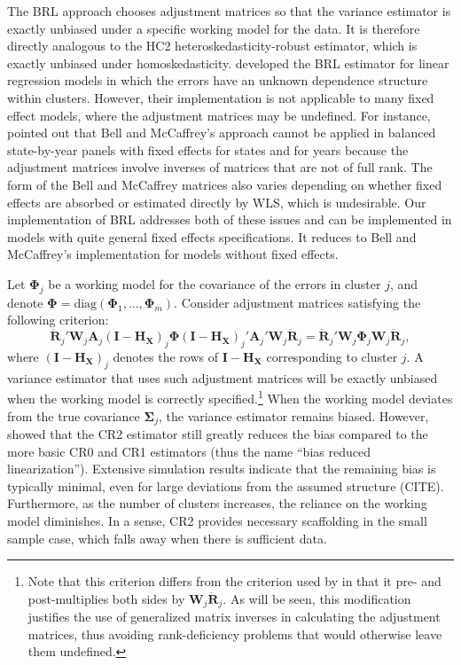 \documentclass[12pt]{article}\usepackage[]{graphicx}\usepackage[]{color}
\newcommand{\bm}{\mathbf}
\newcommand{\bs}{\boldsymbol}
\begin{document}
The BRL approach chooses adjustment matrices so that the variance estimator is exactly unbiased under a specific working model for the data. 
It is therefore directly analogous to the HC2 heteroskedasticity-robust estimator, which is exactly unbiased under homoskedasticity. 
\citet{Bell2002bias} developed the BRL estimator for linear regression models in which the errors have an unknown dependence structure within clusters. 
However, their implementation is not applicable to many fixed effect models, where the adjustment matrices may be undefined. 
For instance, \citet{Angrist2009mostly} pointed out that Bell and McCaffrey's approach cannot be applied in balanced state-by-year panels with fixed effects for states and for years because the adjustment matrices involve inverses of matrices that are not of full rank.
The form of the Bell and McCaffrey matrices also varies depending on whether fixed effects are absorbed or estimated directly by WLS, which is undesirable. Our implementation of BRL addresses both of these issues and can be implemented in models with quite general fixed effects specifications. It reduces to Bell and McCaffrey's implementation for models without fixed effects. 

Let $\bs\Phi_j$ be a working model for the covariance of the errors in cluster $j$, and denote $\bs\Phi = \text{diag}\left(\bs\Phi_1,...,\bs\Phi_m\right)$. Consider adjustment matrices satisfying the following criterion:
\begin{equation}
\label{eq:CR2_criterion}
\bm{\ddot{R}}_j' \bm{W}_j \bm{A}_j \left(\bm{I} - \bm{H_X}\right)_j \bs\Phi \left(\bm{I} - \bm{H_X}\right)_j' \bm{A}_j' \bm{W}_j \bm{\ddot{R}}_j = \bm{\ddot{R}}_j' \bm{W}_j \bs\Phi_j \bm{W}_j \bm{\ddot{R}}_j,
\end{equation}
where $\left(\bm{I} - \bm{H_X}\right)_j$ denotes the rows of $\bm{I} - \bm{H_X}$ corresponding to cluster $j$. 
A variance estimator that uses such adjustment matrices will be exactly unbiased when the working model is correctly specified.\footnote{Note that this criterion differs from the criterion used by \citet{Bell2002bias} in that it pre- and post-multiplies both sides by $\bm{W}_j\bm{\ddot{R}}_j$. 
As will be seen, this modification justifies the use of generalized matrix inverses in calculating the adjustment matrices, thus avoiding rank-deficiency problems that would otherwise leave them undefined.}
When the working model deviates from the true covariance $\bs{\Sigma}_j$, the variance estimator remains biased. However, \citet{Bell2002bias} showed that the CR2 estimator still greatly reduces the bias compared to the more basic CR0 and CR1 estimators (thus the name ``bias reduced linearization''). 
Extensive simulation results indicate that the remaining bias is typically minimal, even for large deviations from the assumed structure (CITE).
Furthermore, as the number of clusters increases, the reliance on the working model diminishes. 
In a sense, CR2 provides necessary scaffolding in the small sample case, which falls away when there is sufficient data.
\end{document}
